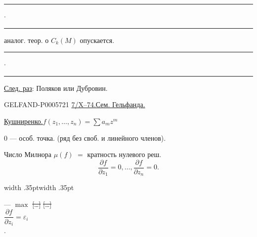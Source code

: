 \noindent\hfill\rule{.95cm}{.32pt}\enspace\(\cdot\)\enspace\rule{1.05cm}{.32pt}\par
аналог. теор. о \(C_k(M)\) опускается.

\noindent\hfill\rule{1.05cm}{.32pt}\enspace\(\cdot\)\enspace\rule{.89cm}{.32pt}\par
\underline{След. раз}: Поляков или Дубровин.


\begin{GelfandAdjacentEvidence}{GELFAND-P000572}{1}
\underline{7/X--74.}\qquad\underline{Сем. Гельфанда.}

\underline{Кушниренко.}\qquad \(f(z_1,\ldots,z_n)=\sum a_m z^m\)

\(0\) — особ. точка. (ряд без своб. и линейного членов).

Число Милнора \(\mu(f)\) \(=\) кратность нулевого реш.
\[
\frac{\partial f}{\partial z_1}=0,\ldots,\frac{\partial f}{\partial z_n}=0.
\]
\noindent\hfill\begin{minipage}{.47\linewidth}
\noindent\vrule width .35pt\hspace{1pt}\vrule width .35pt\enspace
\begin{minipage}{.88\linewidth}
— \underline{\(\max\)}  \sout{[\ldots]} \sout{[\ldots]} \\
\(\dfrac{\partial f}{\partial z_i}=\varepsilon_i\)\\
.
\end{minipage}
\end{minipage}\par
{}
\end{GelfandAdjacentEvidence}
